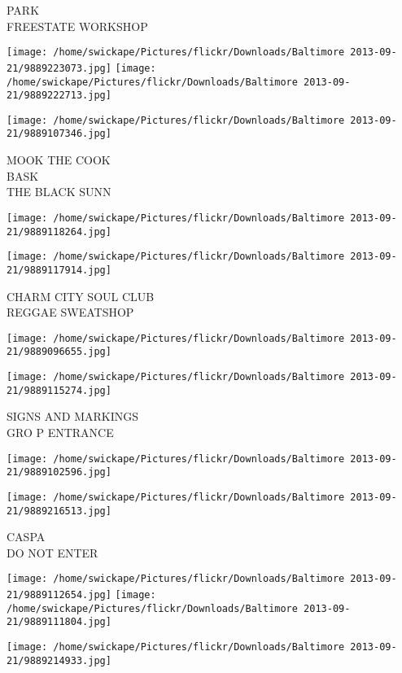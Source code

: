 \documentclass[10pt,letterpaper]{article}
\begin{document}
PARK\\
FREESTATE WORKSHOP
\pagebreak

\texttt{[image: /home/swickape/Pictures/flickr/Downloads/Baltimore 2013-09-21/9889223073.jpg]}
\texttt{[image: /home/swickape/Pictures/flickr/Downloads/Baltimore 2013-09-21/9889222713.jpg]}

\texttt{[image: /home/swickape/Pictures/flickr/Downloads/Baltimore 2013-09-21/9889107346.jpg]}

MOOK THE COOK\\
BASK\\
THE BLACK SUNN
\pagebreak

\texttt{[image: /home/swickape/Pictures/flickr/Downloads/Baltimore 2013-09-21/9889118264.jpg]}

\vspace{0.25in}
\texttt{[image: /home/swickape/Pictures/flickr/Downloads/Baltimore 2013-09-21/9889117914.jpg]}

CHARM CITY SOUL CLUB\\
REGGAE SWEATSHOP
\pagebreak

\texttt{[image: /home/swickape/Pictures/flickr/Downloads/Baltimore 2013-09-21/9889096655.jpg]}

\vspace{0.25in}
\texttt{[image: /home/swickape/Pictures/flickr/Downloads/Baltimore 2013-09-21/9889115274.jpg]}

SIGNS AND MARKINGS\\
GRO P ENTRANCE
\pagebreak

\texttt{[image: /home/swickape/Pictures/flickr/Downloads/Baltimore 2013-09-21/9889102596.jpg]}

\vspace{0.25in}
\texttt{[image: /home/swickape/Pictures/flickr/Downloads/Baltimore 2013-09-21/9889216513.jpg]}

CASPA\\
DO NOT ENTER
\pagebreak

\texttt{[image: /home/swickape/Pictures/flickr/Downloads/Baltimore 2013-09-21/9889112654.jpg]}
\texttt{[image: /home/swickape/Pictures/flickr/Downloads/Baltimore 2013-09-21/9889111804.jpg]}

\vspace{0.25in}
\texttt{[image: /home/swickape/Pictures/flickr/Downloads/Baltimore 2013-09-21/9889214933.jpg]}
\end{document}
